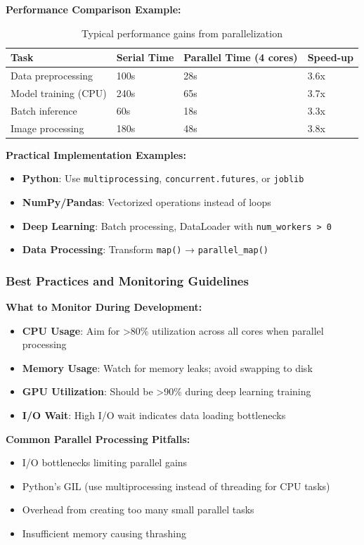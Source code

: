 \documentclass[11pt,a4paper]{article}
\begin{document}
\textbf{Performance Comparison Example:}
\begin{table}[H]
\centering
\begin{tabular}{@{}llll@{}}
\toprule
\textbf{Task} & \textbf{Serial Time} & \textbf{Parallel Time (4 cores)} & \textbf{Speed-up} \\
\midrule
Data preprocessing & 100s & 28s & 3.6x \\
Model training (CPU) & 240s & 65s & 3.7x \\
Batch inference & 60s & 18s & 3.3x \\
Image processing & 180s & 48s & 3.8x \\
\bottomrule
\end{tabular}
\caption{Typical performance gains from parallelization}
\end{table}

\textbf{Practical Implementation Examples:}
\begin{itemize}
    \item \textbf{Python}: Use \texttt{multiprocessing}, \texttt{concurrent.futures}, or \texttt{joblib}
    \item \textbf{NumPy/Pandas}: Vectorized operations instead of loops
    \item \textbf{Deep Learning}: Batch processing, DataLoader with \texttt{num\_workers > 0}
    \item \textbf{Data Processing}: Transform \texttt{map()} → \texttt{parallel\_map()}
\end{itemize}

\subsubsection{Best Practices and Monitoring Guidelines}

\textbf{What to Monitor During Development:}
\begin{itemize}
    \item \textbf{CPU Usage}: Aim for >80\% utilization across all cores when parallel processing
    \item \textbf{Memory Usage}: Watch for memory leaks; avoid swapping to disk
    \item \textbf{GPU Utilization}: Should be >90\% during deep learning training
    \item \textbf{I/O Wait}: High I/O wait indicates data loading bottlenecks
\end{itemize}

\textbf{Common Parallel Processing Pitfalls:}
\begin{itemize}
    \item I/O bottlenecks limiting parallel gains
    \item Python's GIL (use multiprocessing instead of threading for CPU tasks)
    \item Overhead from creating too many small parallel tasks
    \item Insufficient memory causing thrashing
\end{itemize}
\end{document}
